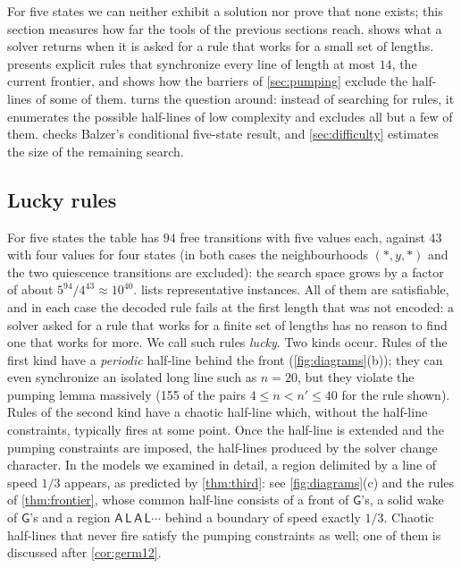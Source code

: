 For five states we can neither exhibit a solution nor prove that none
exists; this section measures how far the tools of the previous sections
reach.  shows what a solver returns when it is asked for a
rule that works for a small set of lengths.  presents
explicit rules that synchronize every line of length at most $14$, the
current frontier, and shows how the barriers of \cref{sec:pumping} exclude
the half-lines of some of them.  turns the question around:
instead of searching for rules, it enumerates the possible half-lines of
low complexity and excludes all but a few of them. 
checks Balzer's conditional five-state result, and \cref{sec:difficulty}
estimates the size of the remaining search.

\subsection{Lucky rules}\label{sec:lucky}

For five states the table has $94$ free transitions with five values each,
against $43$ with four values for four states (in both cases the neighbourhoods
$(\ast,y,\ast)$ and the two quiescence transitions are excluded): the search
space grows by a factor of about $5^{94}/4^{43}\approx10^{40}$.
 lists representative instances. All of them are
satisfiable, and in each case the decoded rule fails at the first length
that was not encoded: a solver asked for a rule that works for a finite set
of lengths has no reason to find one that works for more. We call such
rules \emph{lucky}. Two kinds occur. Rules of the first kind have a \emph{periodic} half-line behind the
front (\cref{fig:diagrams}(b)); they can even synchronize an isolated long
line such as $n=20$, but they violate the pumping lemma massively (155 of the
pairs $4\le n<n'\le40$ for the rule shown). Rules of the second kind have a
chaotic half-line which, without the half-line constraints, typically fires
at some point. Once the half-line is extended and the pumping constraints
are imposed, the half-lines produced by the solver change character. In
the models we examined in detail, a region delimited by a line of speed
$1/3$ appears, as predicted by \cref{thm:third}: see
\cref{fig:diagrams}(c) and the rules of \cref{thm:frontier}, whose common
half-line consists of a front of $\mathsf G$'s, a solid wake of
$\mathsf G$'s and a region $\mathsf{A}\,\mathsf{L}\,\mathsf{A}\,\mathsf{L}\cdots$
behind a boundary of speed exactly $1/3$. Chaotic half-lines
that never fire satisfy the pumping constraints as well; one of them is
discussed after \cref{cor:germ12}.


